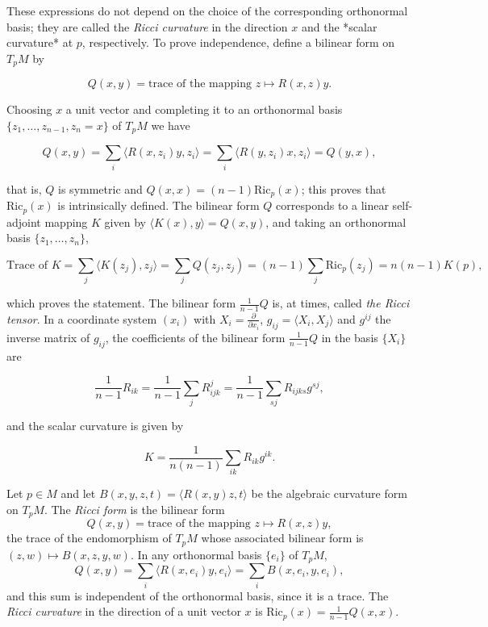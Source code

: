 These expressions do not depend on the choice of the corresponding orthonormal
basis; they are called the \emph{Ricci curvature} in the direction $x$ and the *scalar
curvature* at $p$, respectively. To prove independence, define a bilinear form on
$T_pM$ by

$$
Q(x,y)=\text{trace of the mapping }z\mapsto R(x,z)y.
$$

Choosing $x$ a unit vector and completing it to an orthonormal basis
$\{z_1,\dots,z_{n-1},z_n=x\}$ of $T_pM$ we have

$$
Q(x,y)=\sum_i\langle R(x,z_i)y,z_i\rangle=\sum_i\langle R(y,z_i)x,z_i\rangle=Q(y,x),
$$

that is, $Q$ is symmetric and $Q(x,x)=(n-1)\mathrm{Ric}_p(x)$; this proves that
$\mathrm{Ric}_p(x)$ is intrinsically defined. The bilinear form $Q$ corresponds to
a linear self-adjoint mapping $K$ given by $\langle K(x),y\rangle=Q(x,y)$, and
taking an orthonormal basis $\{z_1,\dots,z_n\}$,

$$
\text{Trace of }K=\sum_j\langle K(z_j),z_j\rangle=\sum_j Q(z_j,z_j)=(n-1)\sum_j\mathrm{Ric}_p(z_j)=n(n-1)K(p),
$$

which proves the statement. The bilinear form $\frac{1}{n-1}Q$ is, at times,
called \emph{the Ricci tensor}. In a coordinate system $(x_i)$ with
$X_i=\frac{\partial}{\partial x_i}$, $g_{ij}=\langle X_i,X_j\rangle$ and $g^{ij}$
the inverse matrix of $g_{ij}$, the coefficients of the bilinear form
$\frac{1}{n-1}Q$ in the basis $\{X_i\}$ are

$$
\frac{1}{n-1}R_{ik}=\frac{1}{n-1}\sum_j R_{ijk}^j=\frac{1}{n-1}\sum_{sj}R_{ijks}g^{sj},
$$

and the scalar curvature is given by

$$
K=\frac{1}{n(n-1)}\sum_{ik}R_{ik}g^{ik}.
$$

\begin{definition}
  \label{def:dc-ch4-4-ricci-form}
  \leanok
  Let $p\in M$ and let $B(x,y,z,t)=\langle R(x,y)z,t\rangle$ be the algebraic
  curvature form on $T_pM$. The \emph{Ricci form} is the bilinear form
  $$
  Q(x,y)=\text{trace of the mapping }z\mapsto R(x,z)y,
  $$
  the trace of the endomorphism of $T_pM$ whose associated bilinear form is
  $(z,w)\mapsto B(x,z,y,w)$. In any orthonormal basis $\{e_i\}$ of $T_pM$,
  $$
  Q(x,y)=\sum_i\langle R(x,e_i)y,e_i\rangle=\sum_i B(x,e_i,y,e_i),
  $$
  and this sum is independent of the orthonormal basis, since it is a trace. The
  \emph{Ricci curvature} in the direction of a unit vector $x$ is
  $\mathrm{Ric}_p(x)=\frac{1}{n-1}Q(x,x)$.
\end{definition}

